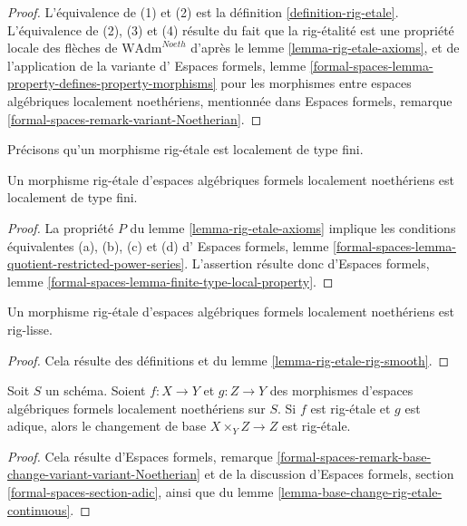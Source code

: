 \begin{proof}
L'équivalence de (1) et (2) est la définition \ref{definition-rig-etale}.
L'équivalence de (2), (3) et (4) résulte du fait que
la rig-étalité est une propriété locale des flèches de
$\text{WAdm}^{Noeth}$ d'après le lemme \ref{lemma-rig-etale-axioms},
et de l'application de la variante d'
Espaces formels, lemme
\ref{formal-spaces-lemma-property-defines-property-morphisms}
pour les morphismes entre espaces algébriques localement noethériens,
mentionnée dans Espaces formels, remarque
\ref{formal-spaces-remark-variant-Noetherian}.
\end{proof}

\noindent
Précisons qu'un morphisme rig-étale est localement de type fini.

\begin{lemma}
\label{lemma-rig-etale-finite-type}
Un morphisme rig-étale d'espaces algébriques formels localement noethériens
est localement de type fini.
\end{lemma}

\begin{proof}
La propriété $P$ du lemme \ref{lemma-rig-etale-axioms}
implique les conditions équivalentes (a), (b), (c) et (d) d'
Espaces formels, lemme
\ref{formal-spaces-lemma-quotient-restricted-power-series}.
L'assertion résulte donc d'Espaces formels,
lemme \ref{formal-spaces-lemma-finite-type-local-property}.
\end{proof}

\begin{lemma}
\label{lemma-rig-etale-rig-smooth-morphism}
Un morphisme rig-étale d'espaces algébriques formels localement noethériens
est rig-lisse.
\end{lemma}

\begin{proof}
Cela résulte des définitions et du
lemme \ref{lemma-rig-etale-rig-smooth}.
\end{proof}

\begin{lemma}
\label{lemma-base-change-rig-etale}
Soit $S$ un schéma. Soient $f : X \to Y$ et $g : Z \to Y$
des morphismes d'espaces algébriques formels localement noethériens sur $S$.
Si $f$ est rig-étale et $g$ est adique, alors le changement de base
$X \times_Y Z \to Z$ est rig-étale.
\end{lemma}

\begin{proof}
Cela résulte d'Espaces formels, remarque
\ref{formal-spaces-remark-base-change-variant-variant-Noetherian}
et de la discussion d'Espaces formels, section
\ref{formal-spaces-section-adic},
ainsi que du lemme \ref{lemma-base-change-rig-etale-continuous}.
\end{proof}

